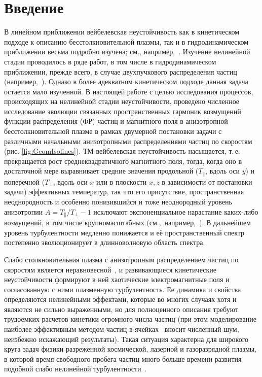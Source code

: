 \chapter*{Введение}                         %
\newcommand{\me}{m_\mathrm{e}}
\newcommand{\wpl}{\omega_\mathrm{p}}

В линейном приближении вейбелевская неустойчивость как в кинетическом подходе к описанию бесстолкновительной плазмы, так и в гидродинамическом приближении весьма подробно изучена; см., например,~\cite{Kocharovsky2016}. Изучение нелинейной стадии проводилось в ряде работ, в том числе в гидродинамическом приближении, прежде всего, в случае двухпучкового распределения частиц (например,~\cite{Romanov2004,Bychenkov2003}). Однако в более адекватном кинетическом подходе данная задача остается мало изученной. В настоящей работе с целью исследования процессов, происходящих на нелинейной стадии неустойчивости, проведено численное исследование эволюции связанных пространственных гармоник возмущений функции распределения (ФР) частиц и магнитного поля в анизотропной бесстолкновительной плазме в рамках двумерной постановки задачи с различными начальными анизотропными распределениями частиц по скоростям (рис. \ref{fig:GeomIsolines}). ТМ-вейбелевская неустойчивость насыщается, т.\,е. прекращается рост среднеквадратичного магнитного поля, тогда, когда оно в достаточной мере выравнивает средние значения продольной ($T_{\|}$, вдоль оси $y$) и поперечной ($T_\perp $, вдоль оси $x$ или в плоскости $x,z$ в зависимости от постановки задачи) эффективных температур, так что его присутствие, пространственная неоднородность и особенно понизившийся и тоже неоднородный уровень анизотропии $A={T_{\|}}/{T_{\perp}}-1$ исключают экспоненциальное нарастание каких-либо возмущений, в том числе крупномасштабных (см.,~например,~\cite{Borodachev2016_Radiofiz}). В дальнейшем уровень турбулентности медленно понижается и её пространственный спектр постепенно эволюционирует в длинноволновую область спектра.

Слабо столкновительная плазма с анизотропным распределением частиц по скоростям является неравновесной~\cite{Mikhailovsky1971,Krall1973}, и развивающиеся кинетические неустойчивости формируют в ней хаотические электромагнитные поля и согласованную с ними плазменную турбулентность. Ее динамика и свойства определяются нелинейными эффектами, которые во многих случаях хотя и являются не сильно выраженными, но для полноценного описания требуют трудоемких расчетов кинетики огромного числа частиц (при этом моделирование наиболее эффективным методом частиц в ячейках~\cite{Kato2005,Borodachev2010,Ruyer2015,Lazar2022,Borodachev2016_Radiofiz,Romanov2004} вносит численный шум, неизбежно искажающий результаты). Такая ситуация характерна для широкого круга задач физики разреженной космической, лазерной и газоразрядной плазмы, в которой время свободного пробега частиц много больше времени развития подобной слабо нелинейной турбулентности~\cite{Baumjohann2012,Treumann2009,Marcowith2016,Gary1993}. 


